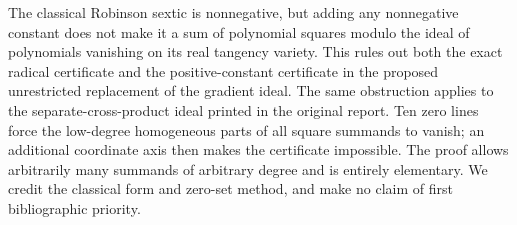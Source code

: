 
The classical Robinson sextic is nonnegative, but adding any nonnegative
constant does not make it a sum of polynomial squares modulo the ideal of
polynomials vanishing on its real tangency variety. This rules out both the
exact radical certificate and the positive-constant certificate in the proposed
unrestricted replacement of the gradient ideal. The same obstruction applies
to the separate-cross-product ideal printed in the original report. Ten zero
lines force the low-degree homogeneous parts of all square summands to vanish;
an additional coordinate axis then makes the certificate impossible. The proof
allows arbitrarily many summands of arbitrary degree and is entirely elementary.
We credit the classical form and zero-set method, and make no claim of first
bibliographic priority.
